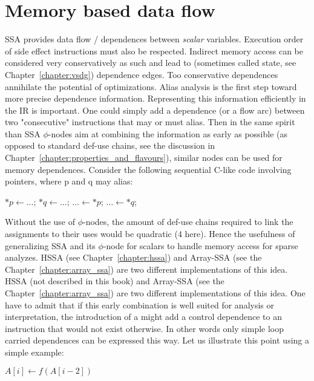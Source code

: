 \section{Memory based data flow}
SSA provides data flow / dependences between \emph{scalar} variables. 
Execution order of side effect instructions must also be respected. 
Indirect memory access can be considered very conservatively as such and lead to (sometimes called state, see Chapter~\ref{chapter:vsdg}) dependence edges. 
Too conservative dependences annihilate the potential of optimizations. 
Alias analysis is the first step toward more precise dependence information. 
Representing this information efficiently in the IR is important. 
One could simply add a dependence (or a flow arc) between two "consecutive" instructions that may or must alias. 
Then in the same spirit than SSA $\phi$-nodes aim at combining the information as early as possible (as opposed to standard def-use chains, see the discussion in Chapter~\ref{chapter:properties_and_flavours}), similar nodes can be used for memory dependences. 
Consider the following sequential C-like code involving pointers, where p and q may alias:

{
\LinesNotNumbered
\qquad\qquad
\begin{algorithm}[H]
$*p \gets \ldots$; \quad
$*q \gets \ldots$; \quad
$\ldots \gets *p$; \quad
$\ldots \gets *q$;
\end{algorithm}
}

\noindent
Without the use of $\phi$-nodes, the amount of def-use chains required to link the assignments to their uses would be quadratic (4 here). 
Hence the usefulness of generalizing SSA and its $\phi$-node for scalars to handle memory access for sparse analyzes. 
\ifhssa
HSSA (see Chapter~\ref{chapter:hssa}) and Array-SSA (see the Chapter~\ref{chapter:array_ssa}) are two different implementations of this idea.
\else
\ifhssa
HSSA (not described in this book) and Array-SSA (see the Chapter~\ref{chapter:array_ssa}) are two different implementations of this idea.
\fi
One have to admit that if this early combination is well suited for analysis or interpretation, the introduction of a \phifun might add a control dependence to an instruction that would not exist otherwise. 
In other words only simple loop carried dependences can be expressed this way. 
Let us illustrate this point using a simple example:

{
\LinesNotNumbered
\begin{algorithm}[H]
   {
    $ A[i] \gets f(A[i-2])$\;
  }
\end{algorithm}
}

